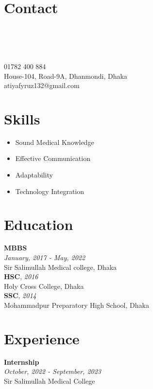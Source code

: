 \documentclass[a4paper,12pt]{article}
\newcommand{\resumeentry}[2]{
    \textbf{#1} \\
    \textit{#2}
}
\begin{document}
\begin{minipage}[t][12cm]{0.35\textwidth}
\raggedright
\section*{Contact}
    \begin{minipage}[t]{0.1\textwidth}
        \faPhone\\
        \faMapMarker\\ \\
        \faEnvelopeO
    \end{minipage}
    \begin{minipage}[t]{0.7\textwidth}
        01782 400 884\\
        House-104, Road-9A, Dhanmondi, Dhaka\\
        atiyafyruz132@gmail.com
    \end{minipage}
\section*{Skills}
\begin{itemize}[left=0em, itemsep=0pt, parsep=0pt]
  \item Sound Medical Knowledge
  \item Effective Communication
  \item Adaptability
  \item Technology Integration
\end{itemize}

\end{minipage}
\hspace{1cm}
\begin{minipage}[t][12cm]{0.58\textwidth}

\section*{Education}
  \resumeentry{MBBS}{January, 2017 - May, 2022}\\ Sir Salimullah Medical college, Dhaka \vspace{0.2cm} \\
  \textbf{HSC}, \textit{2016}\\ Holy Cross College, Dhaka \vspace{0.2cm} \\
  \textbf{SSC}, \textit{2014}\\ Mohammadpur Preparatory High School, Dhaka \\

\section*{Experience}
\resumeentry{Internship}{October, 2022 - September, 2023}\\ Sir Salimullah Medical College \vspace{0.2cm}\\
\end{minipage}
\end{document}
